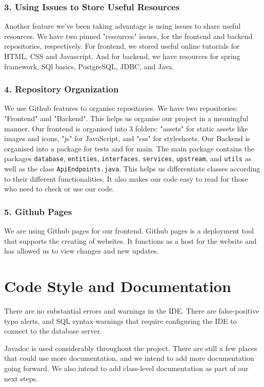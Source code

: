 \documentclass[fontsize=14pt]{article}
\def\code#1{\texttt{#1}}
\begin{document}
\subsubsection*{3. Using Issues to Store Useful Resources}

Another feature we've been taking advantage is using issues to share useful resources. We have two pinned "resources" issues, for the frontend and backend repositories, respectively. For frontend, we stored useful online tutorials for HTML, CSS and Javascript. And for backend, we have resources for spring framework, SQl basics, PostgreSQL, JDBC, and Java.

\subsubsection*{4. Repository Organization}

We use Github features to organise repositories. We have two repositories: "Frontend" and "Backend". This helps us organise our project in a meaningful manner.
Our frontend is organised into 3 folders: "assets" for static assets like images and icons, "js" for JavaScript, and "css" for stylesheets.
Our Backend is organised into a package for tests and for main. The main package contains the packages \code{database}, \code{entities}, \code{interfaces}, \code{services}, \code{upstream}, and \code{utils} as well as the class \code{ApiEndpoints.java}. This helps us differentiate classes according to their different functionalities. It also makes our code easy to read for those who need to check or use our code. 

\subsubsection*{5. Github Pages}
We are using Github pages for our frontend. Github pages is a deployment tool that supports the creating of websites. It functions as a host for the website and has allowed us to view changes and new updates.

\section*{Code Style and Documentation}

There are no substantial errors and warnings in the IDE. There are false-positive typo alerts, and SQL syntax warnings that require configuring the IDE to connect to the database server.

Javadoc is used considerably throughout the project. There are still a few places that could use more documentation, and we intend to add more documentation going forward. We also intend to add class-level documentation as part of our next steps.
\end{document}
